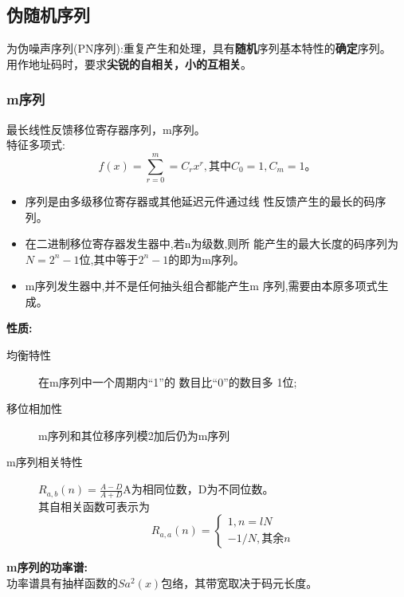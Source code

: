 \subsection{伪随机序列
}
为伪噪声序列(PN序列):重复产生和处理，具有\textbf{随机}序列基本特性的\textbf{确定}序列。\\
用作地址码时，要求\textbf{尖锐的自相关，小的互相关}。

\subsubsection{m序列}
最长线性反馈移位寄存器序列，m序列。\\
特征多项式:
\begin{equation}\label{key}
f(x) =  \sum_{r = 0}^{m} = C_rx^r,\text{其中}C_0 = 1,C_m = 1。
\end{equation}
\begin{itemize}
	\item 序列是由多级移位寄存器或其他延迟元件通过线
	性反馈产生的最长的码序列。
	\item 在二进制移位寄存器发生器中,若n为级数,则所
	能产生的最大长度的码序列为$ N=2^n-1 $位,其中等于$ 2^n-1 $的即为m序列。
	\item m序列发生器中,并不是任何抽头组合都能产生m
	序列,需要由本原多项式生成。
\end{itemize}
\textbf{性质:}
\begin{description}
	\item[均衡特性] 在m序列中一个周期内“1”的
	数目比“0”的数目多 1位;
	\item[移位相加性] m序列和其位移序列模2加后仍为m序列
	\item[m序列相关特性] $ R_{a,b}(n) = \frac{A-D}{A+D} $A为相同位数，D为不同位数。\\其自相关函数可表示为
\[ 	 R_{a,a}(n)= \begin{cases}
		1,n=lN\\
		-1/N,其余n
	\end{cases} \]
\end{description}
\textbf{m序列的功率谱:}\\
功率谱具有抽样函数的$ Sa^2(x) $包络，其带宽取决于码元长度。

